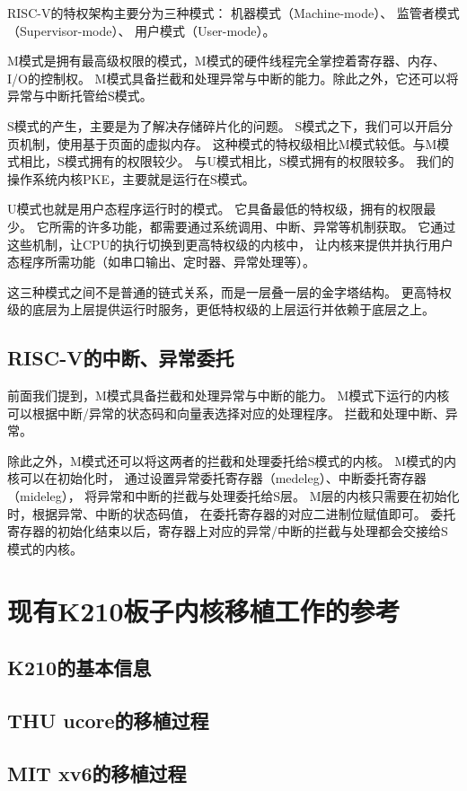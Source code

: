 RISC-V的特权架构主要分为三种模式：
机器模式（Machine-mode）、
监管者模式（Supervisor-mode）、
用户模式（User-mode）。

M模式是拥有最高级权限的模式，M模式的硬件线程完全掌控着寄存器、内存、I/O的控制权。
M模式具备拦截和处理异常与中断的能力。除此之外，它还可以将异常与中断托管给S模式。

S模式的产生，主要是为了解决存储碎片化的问题。
S模式之下，我们可以开启分页机制，使用基于页面的虚拟内存。
这种模式的特权级相比M模式较低。与M模式相比，S模式拥有的权限较少。
与U模式相比，S模式拥有的权限较多。
我们的操作系统内核PKE，主要就是运行在S模式。

U模式也就是用户态程序运行时的模式。
它具备最低的特权级，拥有的权限最少。
它所需的许多功能，都需要通过系统调用、中断、异常等机制获取。
它通过这些机制，让CPU的执行切换到更高特权级的内核中，
让内核来提供并执行用户态程序所需功能（如串口输出、定时器、异常处理等）。

这三种模式之间不是普通的链式关系，而是一层叠一层的金字塔结构。
更高特权级的底层为上层提供运行时服务，更低特权级的上层运行并依赖于底层之上。

\subsection{RISC-V的中断、异常委托}

前面我们提到，M模式具备拦截和处理异常与中断的能力。
M模式下运行的内核可以根据中断/异常的状态码和向量表选择对应的处理程序。
拦截和处理中断、异常。

除此之外，M模式还可以将这两者的拦截和处理委托给S模式的内核。
M模式的内核可以在初始化时，
通过设置异常委托寄存器（medeleg）、中断委托寄存器（mideleg），
将异常和中断的拦截与处理委托给S层。
M层的内核只需要在初始化时，根据异常、中断的状态码值，
在委托寄存器的对应二进制位赋值即可。
委托寄存器的初始化结束以后，寄存器上对应的异常/中断的拦截与处理都会交接给S模式的内核。

\section{现有K210板子内核移植工作的参考}

\subsection{K210的基本信息}

\subsection{THU ucore的移植过程}

\subsection{MIT xv6的移植过程}

